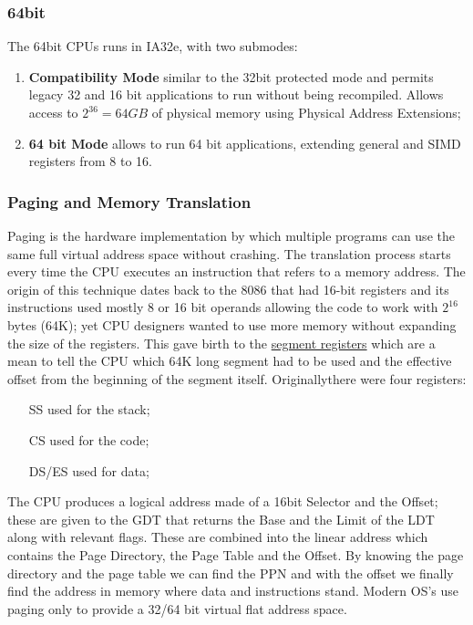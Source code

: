 \documentclass[paper=a4, fontsize=11pt]{report} %
\numberwithin{equation}{section} %
\numberwithin{figure}{section} %
\numberwithin{table}{section} %
\begin{document}
\subsubsection{64bit}
The 64bit CPUs runs in IA32e, with two submodes:
\begin{enumerate}
	\item \textbf{Compatibility Mode} similar to the 32bit protected mode and 
	permits legacy 32 and 16 bit applications to run without being recompiled. 
	Allows access to $2^{36} = 64GB$ of physical memory using Physical Address 
	Extensions;
	\item \textbf{64 bit Mode} allows to run 64 bit applications, extending 
	general and SIMD registers from 8 to 16.
\end{enumerate}
\subsubsection{Paging and Memory Translation}
Paging is the hardware implementation by which multiple programs can use the same full virtual address space without crashing. The translation process starts every time the CPU executes an instruction that refers to a memory address. The origin of this technique dates back to the 8086 that had 16-bit registers and its instructions used mostly 8 or 16 bit operands allowing the code to work with $2^{16}$ bytes (64K); yet CPU designers wanted to use more memory without expanding the size of the registers. This gave birth to the \underline{segment registers} which are a mean to tell the CPU which 64K long segment had to be used and the effective offset from the beginning of the segment itself. Originallythere were four registers:
\begin{itemize}
	\item[SS] used for the stack;
	\item[CS] used for the code;
	\item[DS/ES] used for data;
\end{itemize}
The CPU produces a logical address made of a 16bit Selector and the Offset; 
these are given to the GDT that returns the Base and the Limit of the LDT along 
with relevant flags. These are combined into the linear address which contains 
the Page Directory, the Page Table and the Offset. By knowing the page 
directory and the page table we can find the PPN and with the offset we 
finally find the address in memory where data and instructions stand.
Modern OS's use paging only to provide a 32/64 bit virtual flat address space.
\end{document}
